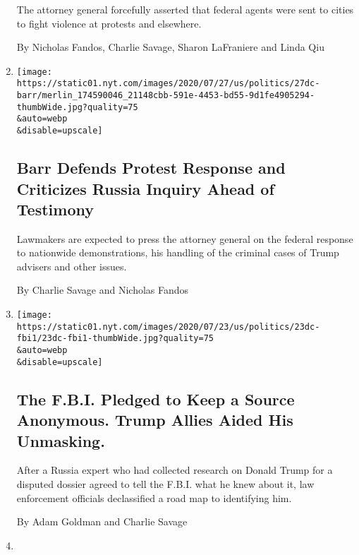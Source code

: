 \begin{enumerate}
  The attorney general forcefully asserted that federal agents were sent
  to cities to fight violence at protests and elsewhere.

  By Nicholas Fandos, Charlie Savage, Sharon LaFraniere and Linda Qiu
\item
  \href{/2020/07/27/us/politics/william-barr-house-judiciary-hearing.html}{}

  \texttt{[image: https://static01.nyt.com/images/2020/07/27/us/politics/27dc-barr/merlin\_174590046\_21148cbb-591e-4453-bd55-9d1fe4905294-thumbWide.jpg?quality=75\\\&auto=webp\\\&disable=upscale]}

  \hypertarget{barr-defends-protest-response-and-criticizes-russia-inquiry-ahead-of-testimony}{%
  \subsection{Barr Defends Protest Response and Criticizes Russia
  Inquiry Ahead of
  Testimony}\label{barr-defends-protest-response-and-criticizes-russia-inquiry-ahead-of-testimony}}

  Lawmakers are expected to press the attorney general on the federal
  response to nationwide demonstrations, his handling of the criminal
  cases of Trump advisers and other issues.

  By Charlie Savage and Nicholas Fandos
\item
  \href{/2020/07/25/us/politics/igor-danchenko-steele-dossier.html}{}

  \texttt{[image: https://static01.nyt.com/images/2020/07/23/us/politics/23dc-fbi1/23dc-fbi1-thumbWide.jpg?quality=75\\\&auto=webp\\\&disable=upscale]}

  \hypertarget{the-fbi-pledged-to-keep-a-source-anonymous-trump-allies-aided-his-unmasking}{%
  \subsection{The F.B.I. Pledged to Keep a Source Anonymous. Trump
  Allies Aided His
  Unmasking.}\label{the-fbi-pledged-to-keep-a-source-anonymous-trump-allies-aided-his-unmasking}}

  After a Russia expert who had collected research on Donald Trump for a
  disputed dossier agreed to tell the F.B.I. what he knew about it, law
  enforcement officials declassified a road map to identifying him.

  By Adam Goldman and Charlie Savage
\item
  \href{/2020/07/23/us/portland-protest-tear-gas-mayor.html}{}


\end{enumerate}
